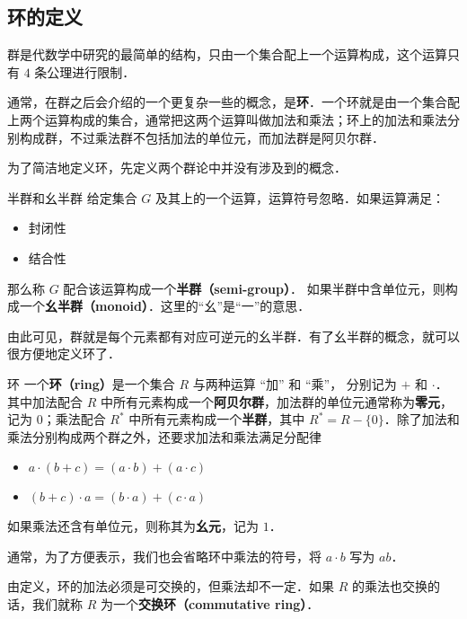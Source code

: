 


\subsection{环的定义}
群是代数学中研究的最简单的结构，只由一个集合配上一个运算构成，这个运算只有 $4$ 条公理进行限制．

通常，在群之后会介绍的一个更复杂一些的概念，是\textbf{环}．一个环就是由一个集合配上两个运算构成的集合，通常把这两个运算叫做加法和乘法；环上的加法和乘法分别构成群，不过乘法群不包括加法的单位元，而加法群是阿贝尔群．

为了简洁地定义环，先定义两个群论中并没有涉及到的概念．

\begin{definition}{半群和幺半群}
给定集合 $G$ 及其上的一个运算，运算符号忽略．如果运算满足：
\begin{itemize}
\item 封闭性
\item 结合性
\end{itemize}
那么称 $G$ 配合该运算构成一个\textbf{半群（semi-group）}．
如果半群中含单位元，则构成一个\textbf{幺半群（monoid）}．这里的“幺”是“一”的意思．
\end{definition}

由此可见，群就是每个元素都有对应可逆元的幺半群．有了幺半群的概念，就可以很方便地定义环了．

\begin{definition}{环}
一个\textbf{环（ring）}是一个集合 $R$ 与两种运算 “加” 和 “乘”， 分别记为 $+$ 和 $\cdot$． 其中加法配合 $R$ 中所有元素构成一个\textbf{阿贝尔群}，加法群的单位元通常称为\textbf{零元}，记为 $0$；乘法配合 $R^*$ 中所有元素构成一个\textbf{半群}，其中 $R^*=R-\{0\}$．除了加法和乘法分别构成两个群之外，还要求加法和乘法满足分配律
\begin{itemize}
\item $a \cdot (b + c) = (a \cdot b) + (a \cdot c)$
\item $(b + c) \cdot a = (b \cdot a) + (c \cdot a)$
\end{itemize}
如果乘法还含有单位元，则称其为\textbf{幺元}，记为 $1$．
\end{definition}

通常，为了方便表示，我们也会省略环中乘法的符号，将 $a\cdot b$ 写为 $ab$．

由定义，环的加法必须是可交换的，但乘法却不一定．如果 $R$ 的乘法也交换的话，我们就称 $R$ 为一个\textbf{交换环（commutative ring）}．

